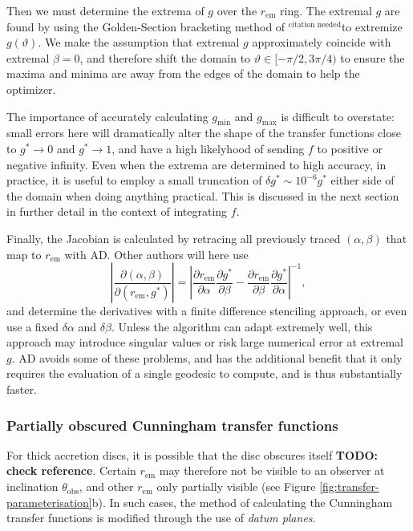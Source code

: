 \documentclass[fleqn,usenatbib]{mnras}
\newcommand{\citneeded}{{\bf \color{red} $^{\text{citation needed}}$}}
\newcommand{\todo}[1]{{\noindent \bf \color{red} TODO: #1}}
\newcommand{\pderiv}[2]{\frac{\partial #1}{\partial #2}}
\begin{document}
Then we must determine the extrema of $g$ over the $r_\text{em}$ ring. The
extremal $g$ are found by using the Golden-Section bracketing method of
\cite{optimize.jl}\citneeded to extremize $g(\vartheta)$. We make the assumption
that extremal $g$ approximately coincide with extremal $\beta = 0$, and therefore
shift the domain to $\vartheta \in [ -\pi/2, 3\pi/4)$ to ensure the maxima and
minima are away from the edges of the domain to help the optimizer.

The importance of accurately calculating $g_\text{min}$ and $g_\text{max}$ is
difficult to overstate: small errors here will dramatically alter the shape of
the transfer functions close to $g^\ast \rightarrow 0$ and $g^\ast \rightarrow
1$, and have a high likelyhood of sending $f$ to positive or negative infinity.
Even when the extrema are determined to high accuracy, in practice, it is useful
to employ a small truncation of $\delta g^\ast \sim 10^{-6}g^\ast$ either side
of the domain when doing anything practical. This is discussed in the next
section in further detail in the context of integrating $f$.

Finally, the Jacobian is calculated by retracing all previously traced $(\alpha,
\beta)$ that map to $r_\text{em}$ with AD. Other authors will here use
\begin{equation}
    \left\lvert
    \pderiv{(\alpha, \beta)}{(r_\text{em}, g^\ast)}
    \right\rvert
    =
    \left\lvert
    \pderiv{r_\text{em}}{\alpha}\pderiv{g^\ast}{\beta}
    -
    \pderiv{r_\text{em}}{\beta}\pderiv{g^\ast}{\alpha}
    \right\rvert^{-1},
\end{equation}
and determine the derivatives with a finite difference stenciling approach, or
even use a fixed $\delta \alpha$ and $\delta \beta$. Unless the algorithm can
adapt extremely well, this approach may introduce singular values or risk large
numerical error at extremal $g$. AD avoids some of these problems, and has the
additional benefit that it only requires the evaluation of a single geodesic to
compute, and is thus substantially faster.

\subsubsection{Partially obscured Cunningham transfer functions}

For thick accretion discs, it is possible that the disc obscures itself
\citep{taylor_x-ray_2018} \todo{check reference}. Certain $r_\text{em}$ may
therefore not be visible to an observer at inclination
$\theta_\text{obs}$, and other $r_\text{em}$ only partially visible (see Figure
\ref{fig:transfer-parameterisation}b). In such cases, the method of calculating
the Cunningham transfer functions is modified through the use of \emph{datum
planes}.
\end{document}
